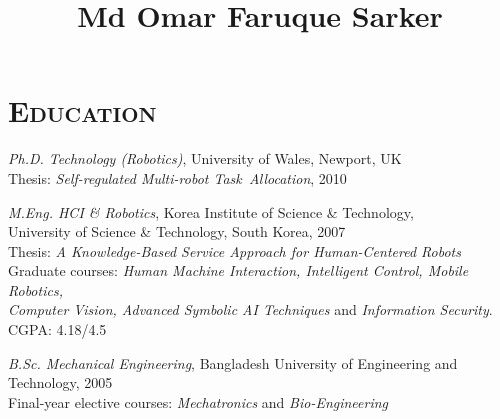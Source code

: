 \documentclass[notopicbreak,contbibnum,plain]{simplecv}
\begin{document}


%
\title{\Large Md Omar Faruque Sarker}
%
\maketitle
\vspace*{-1cm}
\section{\textsc{Education}}
\label{edu}
\begin{topic}
    \item \emph{Ph.D. Technology (Robotics)}, 
    University of Wales, Newport, UK\\
    Thesis: \textit{Self-regulated Multi-robot 				Task~Allocation}, 2010
\vspace*{-0.1cm}
    \item \emph{M.Eng. HCI \& Robotics},  
    Korea Institute of Science \& Technology,\\ University of Science \& Technology, South Korea, 2007\\ 
        Thesis: \textit{A Knowledge-Based Service Approach
for Human-Centered Robots}\\
Graduate courses: \emph{Human Machine Interaction, Intelligent Control, Mobile Robotics,\\ Computer Vision, Advanced Symbolic AI
Techniques} and \emph{Information Security}. CGPA: 4.18/4.5
\vspace*{-0.1cm}
    \item \emph{B.Sc. Mechanical Engineering},
    Bangladesh University of Engineering and Technology, 2005\\       
Final-year elective courses: \emph{Mechatronics} and \emph{Bio-Engineering}
\end{topic}
\end{document}
